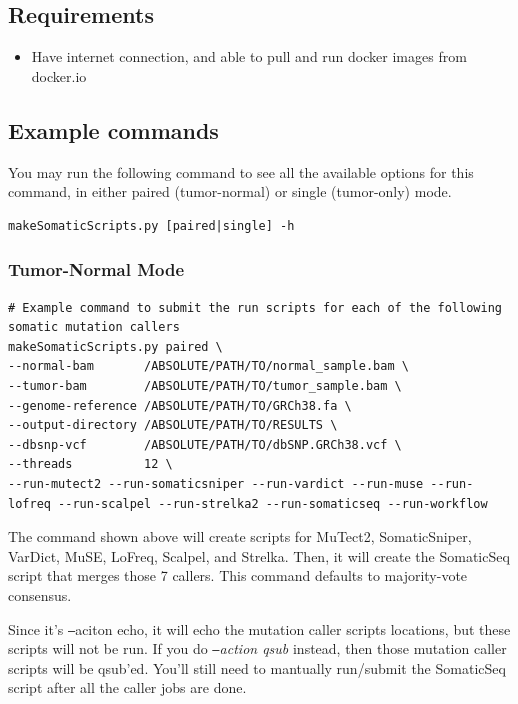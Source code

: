 \documentclass[10pt,letterpaper]{article}
\begin{document}
\begin{sloppypar}
\subsection{Requirements}

  \begin{itemize}
    \item Have internet connection, and able to pull and run docker images from docker.io
  \end{itemize}


\subsection{Example commands}

You may run the following command to see all the available options for this command, in either paired (tumor-normal) or single (tumor-only) mode.

\begin{lstlisting}
makeSomaticScripts.py [paired|single] -h
\end{lstlisting} 

\subsubsection{Tumor-Normal Mode}

\begin{lstlisting}
# Example command to submit the run scripts for each of the following somatic mutation callers
makeSomaticScripts.py paired \
--normal-bam       /ABSOLUTE/PATH/TO/normal_sample.bam \
--tumor-bam        /ABSOLUTE/PATH/TO/tumor_sample.bam \
--genome-reference /ABSOLUTE/PATH/TO/GRCh38.fa \
--output-directory /ABSOLUTE/PATH/TO/RESULTS \
--dbsnp-vcf        /ABSOLUTE/PATH/TO/dbSNP.GRCh38.vcf \
--threads          12 \
--run-mutect2 --run-somaticsniper --run-vardict --run-muse --run-lofreq --run-scalpel --run-strelka2 --run-somaticseq --run-workflow
\end{lstlisting}

The command shown above will create scripts for MuTect2, SomaticSniper, VarDict, MuSE, LoFreq, Scalpel, and Strelka. Then, it will create the SomaticSeq script that merges those 7 callers. This command defaults to majority-vote consensus.

Since it's \texttt{--}aciton echo, it will echo the mutation caller scripts locations, but these scripts will not be run. If you do \textit{\texttt{--}action qsub} instead, then those mutation caller scripts will be qsub'ed. You'll still need to mantually run/submit the SomaticSeq script after all the caller jobs are done.


\end{sloppypar}
\end{document}
